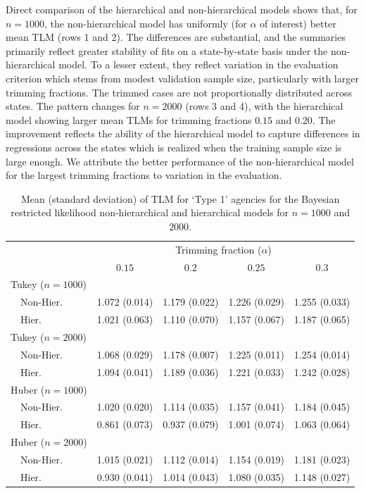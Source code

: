 \documentclass[11pt]{article}
\begin{document}
Direct comparison of the hierarchical and non-hierarchical models shows that, for $n=1000$, the non-hierarchical model has uniformly 
(for $\alpha$ of interest) better mean TLM (rows 1 and 2).  The differences are substantial, and the summaries primarily reflect greater stability of fits on a state-by-state basis under the non-hierarchical model.  To a lesser extent, they reflect variation in the evaluation criterion which stems from modest validation sample size, particularly with larger trimming fractions.  The trimmed cases are not proportionally distributed across states.  The pattern changes for $n=2000$ (rows 3 and 4), with the hierarchical model showing larger mean TLMs for trimming fractions $0.15$ and $0.20$.  The improvement reflects the ability of the hierarchical model to capture differences in regressions across the states which is realized when the training sample size is large enough.  We attribute the better performance of the non-hierarchical model for the largest trimming fractions to variation in the evaluation.  

\begin{table}[!tbp]
{\small
\begin{center}
\begin{tabular}{lllll}
\hline\hline
& \multicolumn{4}{c}{Trimming fraction ($\alpha$)}\\
\multicolumn{1}{l}{}&\multicolumn{1}{c}{$0.15$}&\multicolumn{1}{c}{$0.2$}&\multicolumn{1}{c}{$0.25$}&\multicolumn{1}{c}{$0.3$}\tabularnewline
\hline
{\mdseries Tukey ($n=1000$)}&&&&\tabularnewline
~~Non-Hier.&1.072 (0.014)&1.179 (0.022)&1.226 (0.029)&1.255 (0.033)\tabularnewline
~~Hier.&1.021 (0.063)&1.110 (0.070)&1.157 (0.067)&1.187 (0.065)\tabularnewline
\hline
{\mdseries Tukey ($n=2000$) }&&&&\tabularnewline
~~Non-Hier.&1.068 (0.029)&1.178 (0.007)&1.225 (0.011)&1.254 (0.014)\tabularnewline
~~Hier.&1.094 (0.041)&1.189 (0.036)&1.221 (0.033)&1.242 (0.028)\tabularnewline
\hline
{\mdseries Huber  ($n=1000$)}&&&&\tabularnewline
~~Non-Hier.&1.020 (0.020)&1.114 (0.035)&1.157 (0.041)&1.184 (0.045)\tabularnewline
~~Hier.&0.861 (0.073)&0.937 (0.079)&1.001 (0.074)&1.063 (0.064)\tabularnewline
\hline
{\mdseries Huber ($n=2000$)}&&&&\tabularnewline
~~Non-Hier.&1.015 (0.021)&1.112 (0.014)&1.154 (0.019)&1.181 (0.023)\tabularnewline
~~Hier.&0.930 (0.041)&1.014 (0.043)&1.080 (0.035)&1.148 (0.027)\tabularnewline
\hline
\end{tabular}
\end{center}
\caption{Mean (standard deviation) of TLM for `Type 1' agencies for the Bayesian restricted likelihood non-hierarchical and hierarchical models for $n=1000$ and $2000$.} \label{tab:tlmTable}
}
\end{table}
\end{document}
